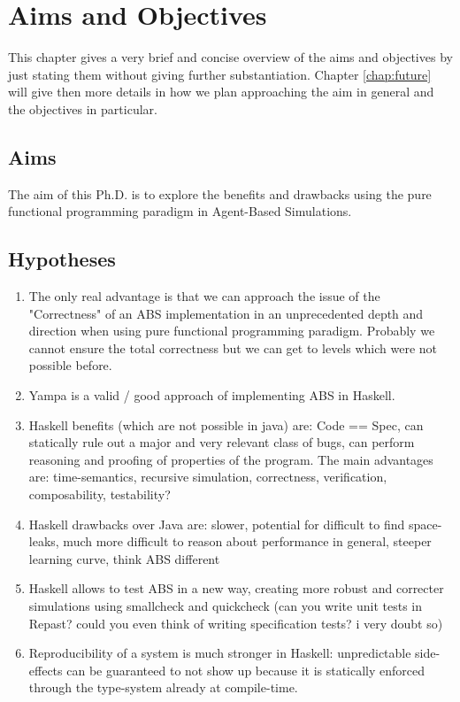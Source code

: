 \chapter{Aims and Objectives}
\label{chap:aimsObj}

This chapter gives a very brief and concise overview of the aims and objectives by just stating them without giving further substantiation. Chapter \ref{chap:future} will give then more details in how we plan approaching the aim in general and the objectives in particular.

\section{Aims}
The aim of this Ph.D. is to explore the benefits and drawbacks using the pure functional programming paradigm in Agent-Based Simulations. 

\section{Hypotheses}
\begin{enumerate}
	\item The only real advantage is that we can approach the issue of the "Correctness" of an ABS implementation in an unprecedented depth and direction when using pure functional programming paradigm. Probably we cannot ensure the total correctness but we can get to levels which were not possible before.
	
	\item Yampa is a valid / good approach of implementing ABS in Haskell.
	
	\item Haskell benefits (which are not possible in java) are: Code == Spec, can statically rule out a major and very relevant class of bugs, can perform reasoning and proofing of properties of the program. The main advantages are: time-semantics, recursive simulation, correctness, verification, composability, testability?

	\item Haskell drawbacks over Java are: slower, potential for difficult to find space-leaks, much more difficult to reason about performance in general, steeper learning curve, think ABS different 
	
	\item Haskell allows to test ABS in a new way, creating more robust and correcter simulations using smallcheck and quickcheck (can you write unit tests in Repast? could you even think of writing specification tests? i very doubt so)
	
	\item Reproducibility of a system is much stronger in Haskell: unpredictable side-effects can be guaranteed to not show up because it is statically enforced through the type-system already at compile-time.
\end{enumerate}

